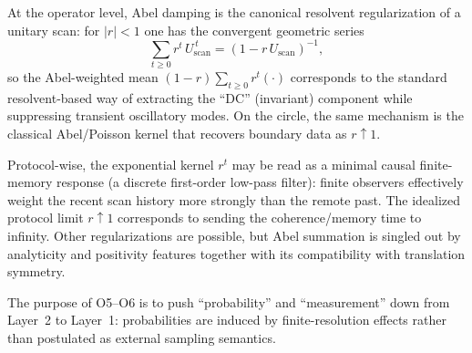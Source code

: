 \begin{remark}
At the operator level, Abel damping is the canonical resolvent regularization of a unitary scan: for $|r|<1$ one has the convergent geometric series
\begin{equation}
\sum_{t\ge 0} r^t\,U_{\mathrm{scan}}^{\,t} = (1-r\,U_{\mathrm{scan}})^{-1},
\end{equation}
so the Abel-weighted mean $(1-r)\sum_{t\ge 0} r^t(\cdot)$ corresponds to the standard resolvent-based way of extracting the ``DC'' (invariant) component while suppressing transient oscillatory modes. On the circle, the same mechanism is the classical Abel/Poisson kernel that recovers boundary data as $r\uparrow 1$.
\par
Protocol-wise, the exponential kernel $r^t$ may be read as a minimal causal finite-memory response (a discrete first-order low-pass filter): finite observers effectively weight the recent scan history more strongly than the remote past. The idealized protocol limit $r\uparrow 1$ corresponds to sending the coherence/memory time to infinity. Other regularizations are possible, but Abel summation is singled out by analyticity and positivity features together with its compatibility with translation symmetry.
\end{remark}

The purpose of O5--O6 is to push ``probability'' and ``measurement'' down from Layer~2 to Layer~1: probabilities are induced by finite-resolution effects rather than postulated as external sampling semantics.


